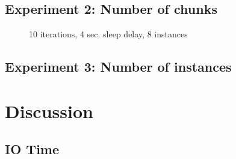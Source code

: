 \documentclass[11pt,a4paper]{article}
\begin{document}
\subsection{Experiment 2: Number of chunks}

\begin{figure}[htp]
    \centering
    
    \caption{10 iterations, 4 sec. sleep delay, 8 instances}
    \label{fig:histo_chunk}
\end{figure}

\subsection{Experiment 3: Number of instances}



\section{Discussion}
\subsection{IO Time}
\end{document}
